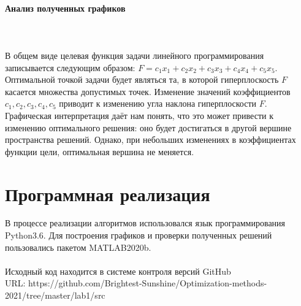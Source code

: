 \documentclass{article}
\begin{document}
\begin{figure}[H]
\label{fig:image}
\end{figure}

\begin{figure}[H]
\label{fig:image}
\end{figure}


\noindent \paragraph{Анализ полученных графиков} 
\label{gr}
\\\\
В общем виде целевая функция задачи линейного программирования записывается следующим образом: $F=c_1x_1 + c_2x_2 + c_3x_3 + c_4x_4 + c_5x_5$.\\
Оптимальной точкой задачи будет являться та, в которой гиперплоскость $F$ касается множества допустимых точек. Изменение значений коэффициентов $c_1, c_2, c_3, c_4, c_5$ приводит к изменению угла наклона гиперплоскости $F$. Графическая интерпретация даёт нам понять, что это может привести к изменению оптимального решения: оно будет достигаться в другой вершине пространства решений. Однако, при небольших изменениях в коэффициентах функции цели, оптимальная вершина не меняется.

\section{Программная реализация}
\noindent В процессе реализации алгоритмов использовался язык программирования Python3.6. Для построения графиков и  проверки полученных решений пользовались пакетом MATLAB2020b.
\\\\
\noindent Исходный код находится в системе контроля версий GitHub 
\\
URL: https://github.com/Brightest-Sunshine/Optimization-methods-2021/tree/master/lab1/src
\end{document}
